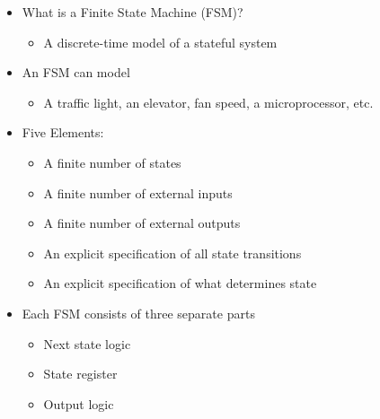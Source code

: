   \begin{itemize}

    \item What is a Finite State Machine (FSM)?

      \begin{itemize}

        \item A discrete-time model of a stateful system

      \end{itemize}

    \item An FSM can model

      \begin{itemize}

        \item A traffic light, an elevator, fan speed, a microprocessor, etc.

      \end{itemize}

    \item Five Elements:

      \begin{itemize}

        \item A finite number of states

        \item A finite number of external inputs

        \item A finite number of external outputs

        \item An explicit specification of all state transitions

        \item An explicit specification of what determines state

      \end{itemize}

    \item Each FSM consists of three separate parts

      \begin{itemize}

        \item Next state logic

        \item State register

        \item Output logic

      \end{itemize}


\end{itemize}
